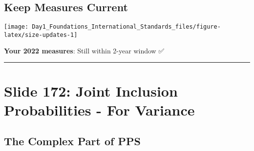 \documentclass[
]{article}
\begin{document}
\subsection{Keep Measures Current}\label{keep-measures-current}

\texttt{[image: Day1\_Foundations\_International\_Standards\_files/figure-latex/size-updates-1]}

\textbf{Your 2022 measures}: Still within 2-year window ✅

\begin{center}\rule{0.5\linewidth}{0.5pt}\end{center}

\section{Slide 172: Joint Inclusion Probabilities - For
Variance}\label{slide-172-joint-inclusion-probabilities---for-variance}

\subsection{The Complex Part of PPS}\label{the-complex-part-of-pps}
\end{document}

